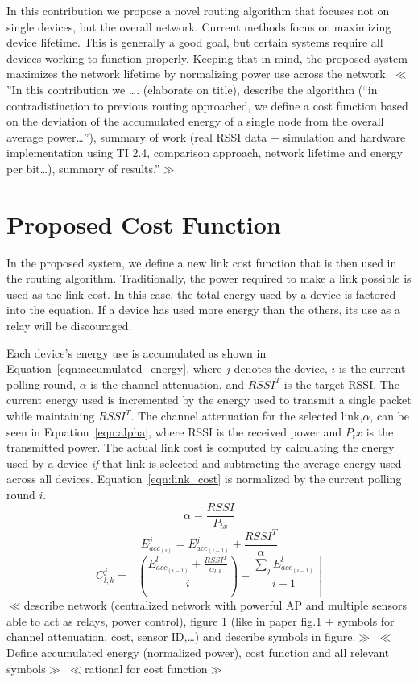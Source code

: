 \documentclass{article}
\begin{document}
In this contribution we propose a novel routing algorithm that focuses not on single devices, but the overall network. Current methods focus on maximizing device lifetime. This is generally a good goal, but certain systems require all devices working to function properly. Keeping that in mind, the proposed system maximizes the network lifetime by normalizing power use across the network.
$\ll$”In this contribution we …. (elaborate on title), describe the algorithm (“in contradistinction to previous routing approached, we define a cost function based on the deviation of the accumulated energy of a single node from the overall average power…”), summary of work (real RSSI data + simulation and hardware implementation using TI 2.4, comparison approach, network lifetime and energy per bit…), summary of results.”$\gg$ 

\section{Proposed Cost Function}
In the proposed system, we define a new link cost function that is then used in the routing algorithm. Traditionally, the power required to make a link possible is used as the link cost. In this case, the total energy used by a device is factored into the equation. If a device has used more energy than the others, its use as a relay will be discouraged.

Each device's energy use is accumulated as shown in Equation~\ref{eqn:accumulated_energy}, where $j$ denotes the device, $i$ is the current polling round, $\alpha$ is the channel attenuation, and $RSSI^T$ is the target RSSI. The current energy used is incremented by the energy used to transmit a single packet while maintaining $RSSI^T$. The channel attenuation for the selected link,$\alpha$, can be seen in Equation~\ref{eqn:alpha}, where RSSI is the received power and $P_tx$ is the transmitted power. The actual link cost is computed by calculating the energy used by a device \emph{if} that link is selected and subtracting the average energy used across all devices. Equation~\ref{eqn:link_cost} is normalized by the current polling round $i$.
\begin{equation}
\label{eqn:alpha}
\alpha = \frac{RSSI}{P_{tx}}
\end{equation}
\begin{equation}
\label{eqn:accumulated_energy}
E^j_{acc_{(i)}} = E^j_{acc_{(i-1)}} + \frac{RSSI^T}{\alpha}
\end{equation}
\begin{equation}
\label{eqn:link_cost}
C^j_{l,k} = \left[ \left(\frac{ E^l_{acc_{(i-1)}} + \frac{RSSI^T}{\alpha_{l,k}}}{i}\right) - \frac{\sum_jE^l_{acc_{(i-1)}}}{i-1} \right]
\end{equation}
$\ll$describe network (centralized network with powerful AP and multiple sensors able to act as relays, power control), figure 1 (like in paper fig.1 + symbols for channel attenuation, cost, sensor ID,…) and describe symbols in figure.$\gg$
$\ll$Define accumulated energy (normalized power), cost function and all relevant symbols$\gg$
$\ll$rational for cost function$\gg$
\end{document}
